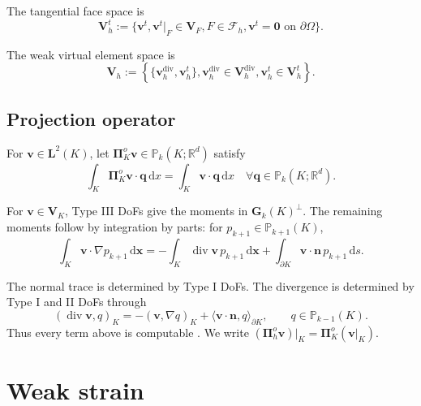 \documentclass[review,hidelinks,onefignum,onetabnum]{siamart251216}
\begin{document}
The tangential face space is
\[
\boldsymbol{V}_h^t := \{ \boldsymbol{v}^t, \boldsymbol{v}^t|_F \in \boldsymbol{V}_F, F \in \mathcal{F}_h, \boldsymbol{v}^t = \boldsymbol{0} \text{ on } \partial \Omega \}.
\]

The weak virtual element space is
\[
\boldsymbol{V}_h := \left\{ \{ \boldsymbol{v}_h^{\operatorname{div}}, \boldsymbol{v}_h^t \}, \boldsymbol{v}_h^{\operatorname{div}} \in \boldsymbol{V}_h^{\operatorname{div}}, \boldsymbol{v}_h^t \in \boldsymbol{V}_h^t \right\}.
\]

\subsection{Projection operator}

For $\boldsymbol v\in\boldsymbol L^2(K)$, let \(\boldsymbol{\Pi}_K^o \boldsymbol{v} \in \mathbb{P}_k(K;\mathbb{R}^d)\) satisfy
\[
\int_K \boldsymbol{\Pi}_K^o \boldsymbol{v} \cdot \boldsymbol{q}\,\mathrm dx = \int_K \boldsymbol{v} \cdot \boldsymbol{q}\,\mathrm dx \quad \forall \boldsymbol{q} \in \mathbb{P}_k(K;\mathbb{R}^d).
\]

For $\boldsymbol v\in\boldsymbol V_K$, Type III DoFs give the moments in $\mathbf G_k(K)^\perp$. The remaining moments follow by integration by parts: for $p_{k+1}\in\mathbb P_{k+1}(K)$,
\[
\int_K \boldsymbol{v} \cdot \nabla p_{k+1} \, \mathrm{d}\boldsymbol{x} = - \int_K \operatorname{div} \boldsymbol{v} \, p_{k+1} \, \mathrm{d}\boldsymbol{x} + \int_{\partial K} \boldsymbol{v} \cdot \boldsymbol{n} \, p_{k+1} \, \mathrm{d}s.
\]

The normal trace is determined by Type I DoFs. The divergence is determined
by Type I and II DoFs through
\[
(\operatorname{div}\boldsymbol v,q)_K
=-(\boldsymbol v,\nabla q)_K+\langle\boldsymbol v\cdot\boldsymbol n,q\rangle_{\partial K},
\qquad q\in\mathbb P_{k-1}(K).
\]
Thus every term above is computable \cite{BBMR2016}. We write
$(\boldsymbol\Pi_h^o\boldsymbol v)|_K=\boldsymbol\Pi_K^o(\boldsymbol v|_K)$.



\section{Weak strain}\label{sec:strain}
\end{document}
